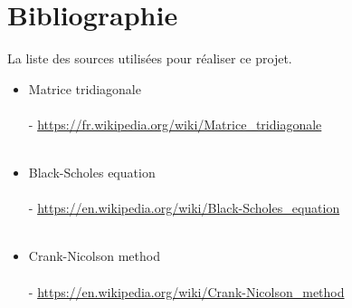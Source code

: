 \documentclass[a4paper, 12pt]{article}
\begin{document}
\newpage
\section{Bibliographie}
La liste des sources utilisées pour réaliser ce projet.
\begin{itemize}
\item Matrice tridiagonale\\\\
      -  \url{https://fr.wikipedia.org/wiki/Matrice_tridiagonale}\\\\

\item Black-Scholes equation \\\\
      -  \url{https://en.wikipedia.org/wiki/Black-Scholes_equation}\\\\
\item Crank-Nicolson method \\\\
      -  \url{https://en.wikipedia.org/wiki/Crank-Nicolson_method}\\\\
      


    
\end{itemize}
\end{document}
